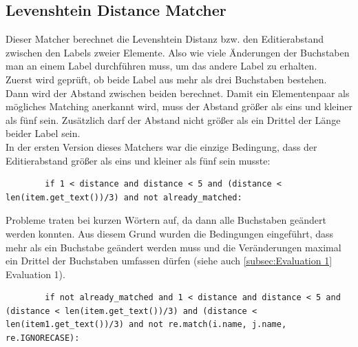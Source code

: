 		\subsection{Levenshtein Distance Matcher}
		Dieser Matcher berechnet die Levenshtein Distanz bzw. den Editierabstand
		zwischen den Labels zweier Elemente. Also wie viele Änderungen der Buchstaben
		man an einem Label durchführen muss, um das andere Label zu erhalten.\\
		Zuerst wird geprüft, ob beide Label aus mehr als drei Buchstaben bestehen.
		Dann wird der Abstand zwischen beiden berechnet. Damit ein
		Elementenpaar als mögliches Matching anerkannt wird, muss der Abstand größer
		als eins und kleiner als fünf sein. Zusätzlich darf der Abstand nicht größer
		als ein Drittel der Länge beider Label sein.\\
		In der ersten Version dieses Matchers war die einzige Bedingung, dass der
		Editierabstand größer als eins und kleiner als fünf sein musste:
		\begin{lstlisting}
		if 1 < distance and distance < 5 and (distance < len(item.get_text())/3) and not already_matched:
		\end{lstlisting}
		Probleme traten bei kurzen Wörtern auf, da dann alle Buchstaben geändert
		werden konnten. Aus diesem Grund wurden die Bedingungen eingeführt, dass mehr als ein Buchstabe
		geändert werden muss und die Veränderungen maximal ein Drittel der Buchstaben
		umfassen dürfen (siehe auch \ref{subsec:Evaluation 1} Evaluation 1).
		\begin{lstlisting}
		if not already_matched and 1 < distance and distance < 5 and (distance < len(item.get_text())/3) and (distance < len(item1.get_text())/3) and not re.match(i.name, j.name, re.IGNORECASE):
		\end{lstlisting}
				
